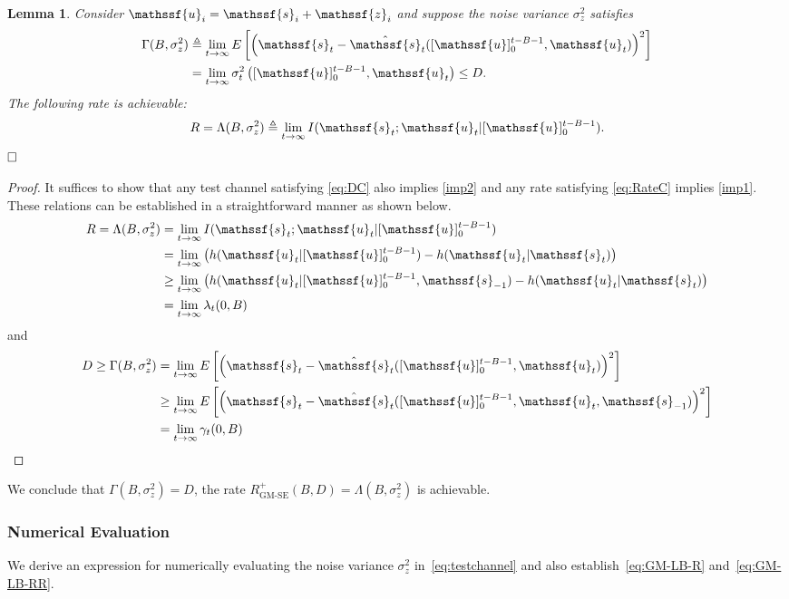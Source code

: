 \documentclass[journal, twocolumn, 10pt]{IEEEtran}
\newtheorem{lemma}{Lemma}
\newcommand{\rvs}{{\mathssf{s}}}    %
\newcommand{\rvu}{{\mathssf{u}}}    %
\newcommand{\rvz}{{\mathssf{z}}}    %
\begin{document}
{\begin{lemma}
\label{claim:1}
Consider $\rvu_{i} = \rvs_{i} + \rvz_{i}$ and suppose the noise variance $\sigma^2_{z}$ satisfies
\begin{align}
\Gamma(B, \sigma^2_{z}) &\triangleq \lim_{t \to \infty} E\left[\left(\rvs_{t} - \hat{\rvs}_{t}([\rvu]_{0}^{t-B-1}, \rvu_{t}) \right)^2\right] \\
& = \lim_{t \to \infty} \sigma^2_{t} \left([\rvu]_{0}^{t-B-1}, \rvu_{t}\right)\le D. \label{eq:DC}
\end{align} 
The following rate is achievable:
\begin{align}
R = \Lambda(B,\sigma^2_{z}) \triangleq \lim_{t\to \infty} I(\rvs_{t} ; \rvu_{t} | [\rvu]_{0}^{t-B-1}). \label{eq:RateC}
\end{align}
$\hfill\Box$
\end{lemma}
\begin{proof}
It suffices to show that any test channel satisfying \eqref{eq:DC} also implies \eqref{imp2}
and any rate satisfying \eqref{eq:RateC} implies  \eqref{imp1}. These relations can be established in a straightforward manner as shown below. 
\begin{align}
R= \Lambda(B,\sigma^2_{z}) &= \lim_{t\to \infty} I(\rvs_{t} ; \rvu_{t} | [\rvu]_{0}^{t-B-1}) \notag\\
&= \lim_{t\to \infty} \left( h( \rvu_{t} | [\rvu]_{0}^{t-B-1}) - h( \rvu_{t} | \rvs_{t})\right)\\
&\ge \lim_{t\to \infty} \left( h( \rvu_{t} | [\rvu]_{0}^{t-B-1}, \rvs_{-1}) - h( \rvu_{t} | \rvs_{t})\right)\\
& =  \lim _{t\to \infty} \lambda_t(0,B)
\end{align} and 
\begin{align}
D\ge \Gamma(B,\sigma^2_{z}) &= \lim_{t \to \infty} E\left[\left(\rvs_{t} - \hat{\rvs}_{t}([\rvu]_{0}^{t-B-1}, \rvu_{t}) \right)^2\right] \\
& \ge \lim_{t \to \infty} E\left[\left(\rvs_{t} - \hat{\rvs}_{t}([\rvu]_{0}^{t-B-1}, \rvu_{t}, \rvs_{-1}) \right)^2\right]\\
&= \lim _{t\to \infty} \gamma_t(0,B) 
\end{align} 
\end{proof}

{ We conclude that $\Gamma(B, \sigma^2_{z}) =D$, the rate $R^{+}_{\textrm{GM-SE}}(B,D) = \Lambda(B,\sigma^2_{z})$ is achievable.}


\subsubsection{Numerical Evaluation} 
\label{sec:NE}
We derive an expression for  numerically evaluating the noise variance $\sigma_z^2$ in~\eqref{eq:testchannel} and also establish~\eqref{eq:GM-LB-R} and~\eqref{eq:GM-LB-RR}.

}
\end{document}
